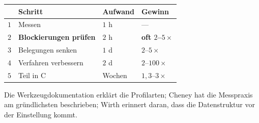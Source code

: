 \begin{aufgabe}
\begin{warnung}
\begin{center}
\renewcommand{\arraystretch}{1.45}
\begin{tabular}{@{}P{1.0cm}P{3.4cm}P{2.0cm}P{2.2cm}@{}}
\toprule
& \textbf{Schritt} & \textbf{Aufwand} & \textbf{Gewinn}\\
\midrule
$1$ & Messen & \textcolor{gruen}{$1$ h} & --- \\
$2$ & \textbf{Blockierungen prüfen} & \textcolor{gruen}{$2$ h} & \textcolor{gruen}{\textbf{oft $2$--$5\times$}}\\
$3$ & Belegungen senken & $1$ d & $2$--$5\times$\\
$4$ & Verfahren verbessern & $2$ d & $2$--$100\times$\\
$5$ & Teil in C & \textcolor{akzent}{Wochen} & $1{,}3$--$3\times$\\
\bottomrule
\end{tabular}
\end{center}

\begin{center}
\begin{minipage}{0.88\textwidth}
\end{minipage}
\end{center}

\begin{center}
\end{center}
\end{warnung}
\end{aufgabe}
\vspace{-4pt}
\noindent Die Werk\-zeug\-do\-ku\-men\-ta\-tion erklärt die Pro\-fil\-ar\-ten; Cheney hat die Mess\-pra\-xis am gründ\-lichs\-ten be\-schrie\-ben; Wirth erinnert daran, dass die Da\-ten\-struk\-tur vor der Ein\-stel\-lung kommt.
